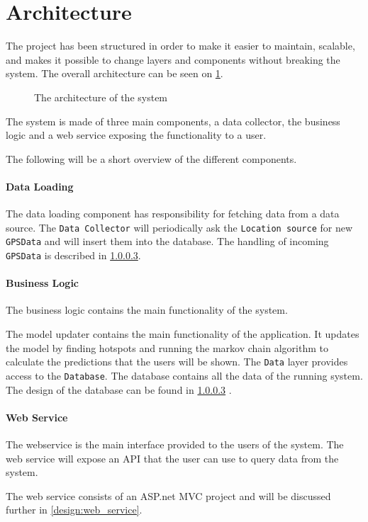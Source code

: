 \section{Architecture}

The project has been structured in order to make it easier to maintain, scalable, and makes it possible to change  layers and components without breaking the system.
The overall architecture can be seen on \cref{arch}.

\begin{figure}[h]
\center

\caption{The architecture of the system}
\label{arch}
\end{figure}

The system is made of three main components, a data collector, the business logic and a web service exposing the functionality to a user.

The following will be a short overview of the different components.

\paragraph{Data Loading}
The data loading component has responsibility for fetching data from a data source.
The \texttt{Data Collector} will periodically ask the \texttt{Location source} for new \texttt{GPSData} and will insert them into the database. 
The handling of incoming \texttt{GPSData} is described in  \cref{}.

\paragraph{Business Logic}
The business logic contains the main functionality of the system.

The model updater contains the main functionality of the application.
It updates the model by finding hotspots and running the markov chain algorithm to calculate the predictions that the users will be shown.
The \texttt{Data} layer provides access to the \texttt{Database}.
The database contains all the data of the running system.
The design of the database can be found in \cref{} .

\paragraph{Web Service}
The webservice is the main interface provided to the users of the system.
The web service will expose an API that the user can use to query data from the system.

The web service consists of an ASP.net MVC project and will be discussed further in \cref{design:web_service}.





